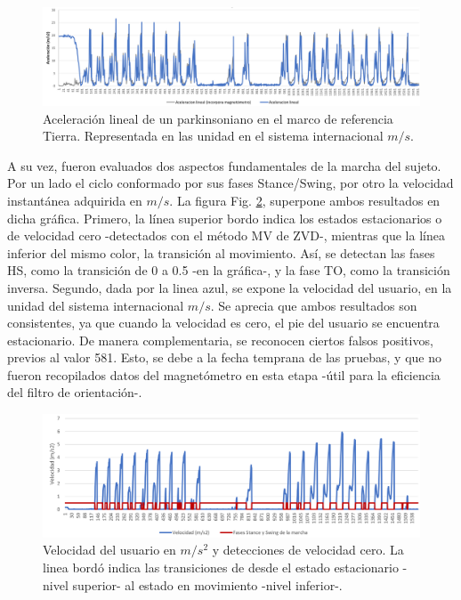 \begin{figure}[h!]
\hspace*{-2.9cm}%
\includegraphics[clip,width=1.4 \columnwidth]{TESIS/imagenes/chap06/linnear-acceleration.PNG}
\caption{Aceleración lineal de un parkinsoniano en el marco de referencia Tierra. Representada en las unidad en el sistema internacional $m/s$.}
\label{fig:acceleration}
\end{figure}

A su vez, fueron evaluados dos aspectos fundamentales de la marcha del sujeto. Por un lado el ciclo conformado por sus fases Stance/Swing, por otro la velocidad instantánea adquirida en $m/s$. La figura Fig. \ref{fig:zvd-velocity}, superpone ambos resultados en dicha gráfica. Primero, la línea superior bordo indica los estados estacionarios o de velocidad cero -detectados con el método MV de ZVD-, mientras que la línea inferior del mismo color, la transición al movimiento. Así, se detectan las fases HS, como la transición de 0 a 0.5 -en la gráfica-, y la fase TO, como la transición inversa. Segundo, dada por la linea azul, se expone la velocidad del usuario, en la unidad del sistema internacional $m/s$. Se aprecia que ambos resultados son consistentes, ya que cuando la velocidad es cero, el pie del usuario se encuentra estacionario.
\noindent De manera complementaria, se reconocen ciertos falsos positivos, previos al valor 581. Esto, se debe a la fecha temprana de las pruebas, y que no fueron recopilados datos del magnetómetro en esta etapa -útil para la eficiencia del filtro de orientación-.

\begin{figure}[h!]
\hspace*{-2.9cm}%
\includegraphics[clip,width=1.4 \columnwidth]{TESIS/imagenes/chap06/velocity-zvd.PNG}
\caption{Velocidad del usuario en $m/s^2$ y detecciones de velocidad cero. La linea bordó indica las transiciones de desde el estado estacionario -nivel superior- al estado en movimiento -nivel inferior-.}
\label{fig:zvd-velocity}
\end{figure}


